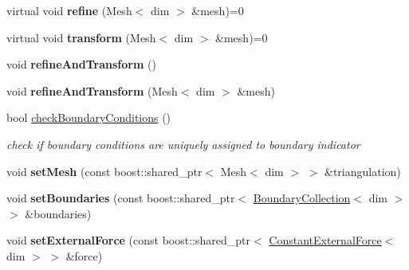 \begin{DoxyCompactItemize}
\item 
\hypertarget{classnatrium_1_1ProblemDescription_ac60c308fbab126339ec08e2377fc77bb}{
virtual void {\bfseries refine} (Mesh$<$ dim $>$ \&mesh)=0}
\label{classnatrium_1_1ProblemDescription_ac60c308fbab126339ec08e2377fc77bb}

\item 
\hypertarget{classnatrium_1_1ProblemDescription_aedee850a39034390229f3e1131b00fad}{
virtual void {\bfseries transform} (Mesh$<$ dim $>$ \&mesh)=0}
\label{classnatrium_1_1ProblemDescription_aedee850a39034390229f3e1131b00fad}

\item 
\hypertarget{classnatrium_1_1ProblemDescription_a9487f2c9b6f6845d1eac886470b91457}{
void {\bfseries refineAndTransform} ()}
\label{classnatrium_1_1ProblemDescription_a9487f2c9b6f6845d1eac886470b91457}

\item 
\hypertarget{classnatrium_1_1ProblemDescription_aa8ca60598929e469f18e5ebf37d2ad6e}{
void {\bfseries refineAndTransform} (Mesh$<$ dim $>$ \&mesh)}
\label{classnatrium_1_1ProblemDescription_aa8ca60598929e469f18e5ebf37d2ad6e}

\item 
bool \hyperlink{classnatrium_1_1ProblemDescription_aed8ec93fcba6c0b78c04ef91b8703f7a}{checkBoundaryConditions} ()
\begin{DoxyCompactList}\small\item\em check if boundary conditions are uniquely assigned to boundary indicator \item\end{DoxyCompactList}\item 
\hypertarget{classnatrium_1_1ProblemDescription_afeb7e2a712c3fb816d8491cb01d02156}{
void {\bfseries setMesh} (const boost::shared\_\-ptr$<$ Mesh$<$ dim $>$ $>$ \&triangulation)}
\label{classnatrium_1_1ProblemDescription_afeb7e2a712c3fb816d8491cb01d02156}

\item 
\hypertarget{classnatrium_1_1ProblemDescription_a9078dc3c0da45f600e8b2375f321494e}{
void {\bfseries setBoundaries} (const boost::shared\_\-ptr$<$ \hyperlink{classnatrium_1_1BoundaryCollection}{BoundaryCollection}$<$ dim $>$ $>$ \&boundaries)}
\label{classnatrium_1_1ProblemDescription_a9078dc3c0da45f600e8b2375f321494e}

\item 
\hypertarget{classnatrium_1_1ProblemDescription_a02ed1361dced4a544fea2c50af06fe65}{
void {\bfseries setExternalForce} (const boost::shared\_\-ptr$<$ \hyperlink{classnatrium_1_1ConstantExternalForce}{ConstantExternalForce}$<$ dim $>$ $>$ \&force)}
\label{classnatrium_1_1ProblemDescription_a02ed1361dced4a544fea2c50af06fe65}


\end{DoxyCompactItemize}
